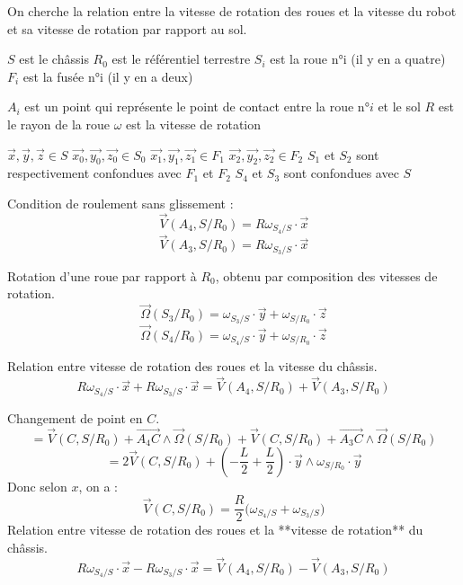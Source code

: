 \documentclass[a4paper,12pt]{report}  %
\begin{document}

On cherche la relation entre la vitesse de rotation des roues et la vitesse du robot et sa vitesse de rotation par rapport au sol. 


$S$ est le châssis 
$R_0$ est le référentiel terrestre 
$S_i$ est la roue n°i (il y en a quatre) 
$F_i$ est la fusée n°i (il y en a deux) 

$A_i$ est un point qui représente le point de contact entre la roue n°$i$ et le sol 
$R$ est le rayon de la roue 
$\omega$ est la vitesse de rotation 

$\vec{x},\vec{y},\vec{z} \in S$ 
$\vec{x_0},\vec{y_0},\vec{z_0} \in S_0$ 
$\vec{x_1},\vec{y_1},\vec{z_1} \in F_1$ 
$\vec{x_2},\vec{y_2},\vec{z_2} \in F_2$ 
$S_1$ et $S_2$ sont respectivement confondues avec $F_1$ et $F_2$ 
$S_4$ et $S_3$ sont confondues avec $S$ 

Condition de roulement sans glissement : 
\begin{equation}
	\vec{V}(A_4, S/R_0) = R\omega_{S_4/S} \cdot \vec{x} \tag{1}
\end{equation}
\begin{equation}
	\vec{V}(A_3, S/R_0)=R\omega_{S_3/S} \cdot \vec{x} \tag{2}
\end{equation}

Rotation d'une roue par rapport à $R_0$, obtenu par composition des vitesses de rotation. 
\begin{equation}
	\vec{\Omega}(S_3/R_0) = \omega_{S_3/S} \cdot \vec{y} + \omega_{S/R_0} \cdot \vec{z} \tag{3}
\end{equation}
\begin{equation}
	\vec{\Omega}(S_4/R_0) = \omega_{S_4/S} \cdot \vec{y} + \omega_{S/R_0} \cdot \vec{z} \tag{4}
\end{equation}

Relation entre vitesse de rotation des roues et la vitesse du châssis. 
\begin{equation}
	R\omega_{S_4/S} \cdot \vec{x} + R\omega_{S_3/S} \cdot \vec{x}
	=
	\vec{V}(A_4, S/R_0) + \vec{V}(A_3, S/R_0) 
	\tag{1)+(2}
\end{equation}

Changement de point en $C$. 
$$ = 
\vec{V}(C,S/R_0) 
+ \overrightarrow{A_{4}C} \wedge \vec{\Omega}(S/R_0) 
+ \vec{V}(C,S/R_0) 
+ \overrightarrow{A_{3}C} \wedge \vec{\Omega}(S/R_0) 
$$
$$
= 2\vec{V}(C,S/R_0) + (-\frac{L}{2} + \frac{L}{2}) \cdot \vec{y} \wedge \omega_{S/R_0} \cdot \vec{y}
$$
Donc selon $x$, on a : 
$$
\boxed{
	\vec{V}(C,S/R_0) = \frac{R}{2}\bigg( \omega_{S_4/S} + \omega_{S_3/S} \bigg)
}
$$
Relation entre vitesse de rotation des roues et la **vitesse de rotation** du châssis. 
\begin{equation}
	R\omega_{S_4/S} \cdot \vec{x} - R\omega_{S_3/S} \cdot \vec{x}
	=
	\vec{V}(A_4, S/R_0) - \vec{V}(A_3, S/R_0) 
	\tag{1)–(2}
\end{equation}
\end{document}
